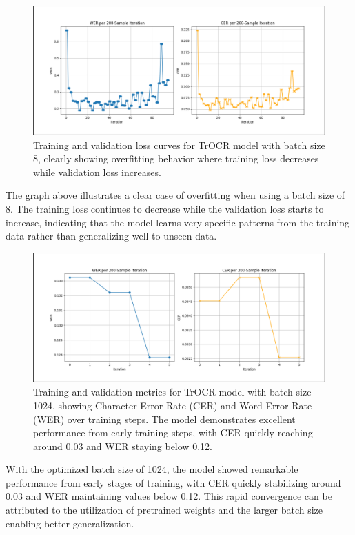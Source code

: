\begin{figure}[H]
    \centering
    \includegraphics[width=\textwidth]{figures/trocr_overfitting_v1.png}
    \caption{Training and validation loss curves for TrOCR model with batch size 8, 
    clearly showing overfitting behavior where training loss decreases while validation loss increases.}
    \label{fig:trocr-overfitting}
\end{figure}

The graph above illustrates a clear case of overfitting when using a batch size of 8. The training loss continues to decrease while the validation loss starts to increase, indicating that the model learns very specific patterns from the training data rather than generalizing well to unseen data.

\begin{figure}[H]
    \centering
    \includegraphics[width=\textwidth]{figures/trocr_fine_tuning.png}
    \caption{Training and validation metrics for TrOCR model with batch size 1024, 
    showing Character Error Rate (CER) and Word Error Rate (WER) over training steps. 
    The model demonstrates excellent performance from early training steps, with CER quickly 
    reaching around 0.03 and WER staying below 0.12.}
    \label{fig:trocr-fine-tuning}
\end{figure}

With the optimized batch size of 1024, the model showed remarkable performance from early stages of training, with CER quickly stabilizing around 0.03 and WER maintaining values below 0.12. This rapid convergence can be attributed to the utilization of pretrained weights and the larger batch size enabling better generalization.

